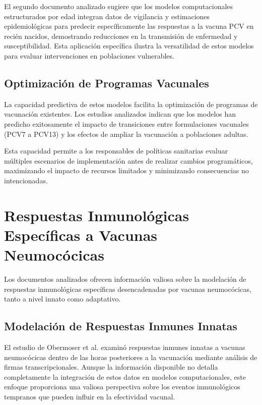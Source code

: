 El segundo documento analizado sugiere que los modelos computacionales estructurados por edad integran datos de vigilancia y estimaciones epidemiológicas para predecir específicamente las respuestas a la vacuna PCV en recién nacidos, demostrando reducciones en la transmisión de enfermedad y susceptibilidad. Esta aplicación específica ilustra la versatilidad de estos modelos para evaluar intervenciones en poblaciones vulnerables.

\subsection{Optimización de Programas Vacunales}

La capacidad predictiva de estos modelos facilita la optimización de programas de vacunación existentes. Los estudios analizados indican que los modelos han predicho exitosamente el impacto de transiciones entre formulaciones vacunales (PCV7 a PCV13) y los efectos de ampliar la vacunación a poblaciones adultas.

Esta capacidad permite a los responsables de políticas sanitarias evaluar múltiples escenarios de implementación antes de realizar cambios programáticos, maximizando el impacto de recursos limitados y minimizando consecuencias no intencionadas.

\section{Respuestas Inmunológicas Específicas a Vacunas Neumocócicas}

Los documentos analizados ofrecen información valiosa sobre la modelación de respuestas inmunológicas específicas desencadenadas por vacunas neumocócicas, tanto a nivel innato como adaptativo.

\subsection{Modelación de Respuestas Inmunes Innatas}

El estudio de Obermoser et al. \cite{Obermoser2013} examinó respuestas inmunes innatas a vacunas neumocócicas dentro de las horas posteriores a la vacunación mediante análisis de firmas transcripcionales. Aunque la información disponible no detalla completamente la integración de estos datos en modelos computacionales, este enfoque proporciona una valiosa perspectiva sobre los eventos inmunológicos tempranos que pueden influir en la efectividad vacunal.


